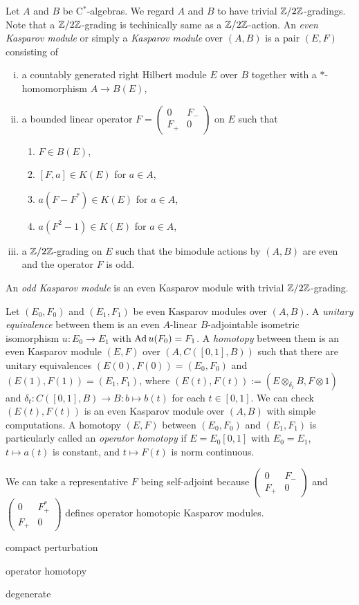 \documentclass{../../large}
\begin{document}
\begin{prb}
Let $A$ and $B$ be C$^*$-algebras.
We regard $A$ and $B$ to have trivial $\mathbb{Z}/2\mathbb{Z}$-gradings.
Note that a $\mathbb{Z}/2\mathbb{Z}$-grading is techinically same as a $\mathbb{Z}/2\mathbb{Z}$-action.
An \emph{even Kasparov module} or simply a \emph{Kasparov module} over $(A,B)$ is a pair $(E,F)$ consisting of
\begin{enumerate}[(i)]
\item a countably generated right Hilbert module $E$ over $B$ together with a $*$-homomorphism $A\to B(E)$,
\item a bounded linear operator $\textstyle F=\left(\begin{smallmatrix}0&F_-\\F_+&0\end{smallmatrix}\right)$ on $E$ such that
\begin{enumerate}[(\text{ii}.i)]
\item $F\in B(E)$,
\item $[F,a]\in K(E)$ for $a\in A$,
\item $a(F-F^*)\in K(E)$ for $a\in A$,
\item $a(F^2-1)\in K(E)$ for $a\in A$,
\end{enumerate}
\item a $\mathbb{Z}/2\mathbb{Z}$-grading on $E$ such that the bimodule actions by $(A,B)$ are even and the operator $F$ is odd.
\end{enumerate}
An \emph{odd Kasparov module} is an even Kasparov module with trivial $\mathbb{Z}/2\mathbb{Z}$-grading.

Let $(E_0,F_0)$ and $(E_1,F_1)$ be even Kasparov modules over $(A,B)$.
A \emph{unitary equivalence} between them is an even $A$-linear $B$-adjointable isometric isomorphism $u:E_0\to E_1$ with $\operatorname{Ad} u(F_0)=F_1$.
A \emph{homotopy} between them is an even Kasparov module $(E,F)$ over $(A,C([0,1],B))$ such that there are unitary equivalences $(E(0),F(0))=(E_0,F_0)$ and $(E(1),F(1))=(E_1,F_1)$, where $(E(t),F(t)):=(E\otimes_{\delta_t}B,F\otimes1)$ and $\delta_t:C([0,1],B)\to B:b\mapsto b(t)$ for each $t\in[0,1]$.
We can check $(E(t),F(t))$ is an even Kasparov module over $(A,B)$ with simple computations.
A homotopy $(E,F)$ between $(E_0,F_0)$ and $(E_1,F_1)$ is particularly called an \emph{operator homotopy} if $E=E_0[0,1]$ with $E_0=E_1$, $t\mapsto a(t)$ is constant, and $t\mapsto F(t)$ is norm continuous.

We can take a representative $F$ being self-adjoint because $\left(\begin{smallmatrix}0&F_-\\F_+&0\end{smallmatrix}\right)$ and $\left(\begin{smallmatrix}0&F_+^*\\F_+&0\end{smallmatrix}\right)$ defines operator homotopic Kasparov modules.
\begin{parts}
\item compact perturbation
\item operator homotopy
\item degenerate
\end{parts}
\end{prb}
\end{document}
